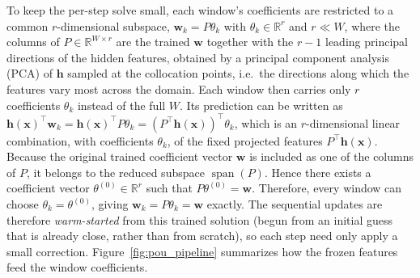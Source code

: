 \documentclass[a4paper,fleqn]{cas-sc}
\begin{document}
To keep the per-step solve small, each window's coefficients are restricted to
a common \(r\)-dimensional subspace, \(\mathbf{w}_k=P\theta_k\) with
\(\theta_k\in\mathbb{R}^{r}\) and \(r\ll W\), where the columns of
\(P\in\mathbb{R}^{W\times r}\) are the trained \(\mathbf{w}\) together with the
\(r-1\) leading principal directions of the hidden features, obtained by a
principal component analysis (PCA) of \(\mathbf{h}\) sampled at the collocation
points, i.e.\ the directions along which the features vary most across the
domain.
Each window then carries only \(r\) coefficients \(\theta_k\) instead of the
full \(W\). Its prediction can be written as
\(\mathbf{h}(\mathbf{x})^{\!\top}\mathbf{w}_k
=\mathbf{h}(\mathbf{x})^{\!\top}P\theta_k
=\left(P^{\top}\mathbf{h}(\mathbf{x})\right)^{\!\top}\theta_k\), which is an
\(r\)-dimensional linear combination, with coefficients \(\theta_k\), of the
fixed projected features \(P^{\top}\mathbf{h}(\mathbf{x})\).
Because the original trained coefficient vector \(\mathbf{w}\) is included as
one of the columns of \(P\), it belongs to the reduced subspace
\(\operatorname{span}(P)\). Hence there exists a coefficient vector
\(\theta^{(0)}\in\mathbb{R}^r\) such that \(P\theta^{(0)}=\mathbf{w}\).
Therefore, every window can choose \(\theta_k=\theta^{(0)}\), giving
\(\mathbf{w}_k=P\theta_k=\mathbf{w}\) exactly. The sequential updates are
therefore \emph{warm-started} from this trained solution (begun from an initial
guess that is already close, rather than from scratch), so each step need only
apply a small correction. Figure~\ref{fig:pou_pipeline} summarizes how the
frozen features feed the window coefficients.
\end{document}
